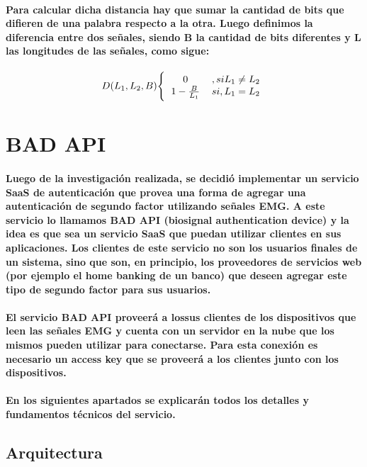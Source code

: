 \documentclass{article}
\begin{document}
\paragraph{
Para calcular dicha distancia hay que sumar la cantidad de bits que difieren de una palabra respecto a la otra. Luego definimos la diferencia entre dos señales, siendo B la cantidad de bits diferentes y L las longitudes de las señales, como sigue:
}

\begin{center}
\[
D(L_1, L_2, B)
\Bigg\{
  \begin{tabular}{ c c }
  0 & $, si L_1 \neq L_2$ \\
  $1 - \frac{B}{L_1}$ & $si, L_1 = L_2$
  \end{tabular}
\]
\end{center}

\section{BAD API}
\paragraph{
Luego de la investigación realizada, se decidió implementar un servicio SaaS de autenticación que provea una forma de agregar una autenticación de segundo factor utilizando señales EMG. A este servicio lo llamamos BAD API (biosignal authentication device) y la idea es que sea un servicio SaaS que puedan utilizar clientes en sus aplicaciones. Los clientes de este servicio no son los usuarios finales de un sistema, sino que son, en principio, los proveedores de servicios web (por ejemplo el home banking de un banco) que deseen agregar este tipo de segundo factor para sus usuarios.
}
\paragraph{
El servicio BAD API proveerá a lossus clientes de los dispositivos que leen las señales EMG y cuenta con un servidor en la nube que los mismos pueden utilizar para conectarse. Para esta conexión es necesario un access key que se proveerá a los clientes junto con los dispositivos.
}
\paragraph{
En los siguientes apartados se explicarán todos los detalles y fundamentos técnicos del servicio.
}

\subsection{Arquitectura}
\end{document}

